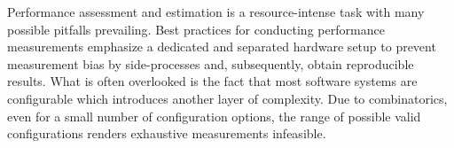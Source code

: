 \documentclass[sigconf]{acmart}
\begin{document}
	Performance assessment and estimation is a resource-intense task with many possible pitfalls prevailing.
	Best practices for conducting performance measurements emphasize a dedicated and separated hardware setup to prevent measurement bias by side-processes and, subsequently, obtain reproducible results.	%
	What is often overlooked is the fact that most software systems are configurable which introduces another layer of complexity.
	Due to combinatorics, even for a small number of configuration options, the range of possible valid configurations renders exhaustive measurements infeasible.
	
	
\end{document}
